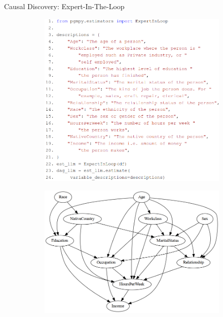 \documentclass[aspectratio=169]{beamer}
\begin{document}
\begin{frame}{Causal Discovery: Expert-In-The-Loop}
	\begin{figure}
		\begin{subfigure}{0.5 \textwidth}
			\centering
			\includegraphics[scale=0.22]{imgs/dag_llm.png}
		\end{subfigure}%
		\begin{subfigure}{0.5 \textwidth}
			\centering
			\includegraphics[scale=0.22]{imgs/adult_llm.png}
		\end{subfigure}
	\end{figure}

\end{frame}
\end{document}
